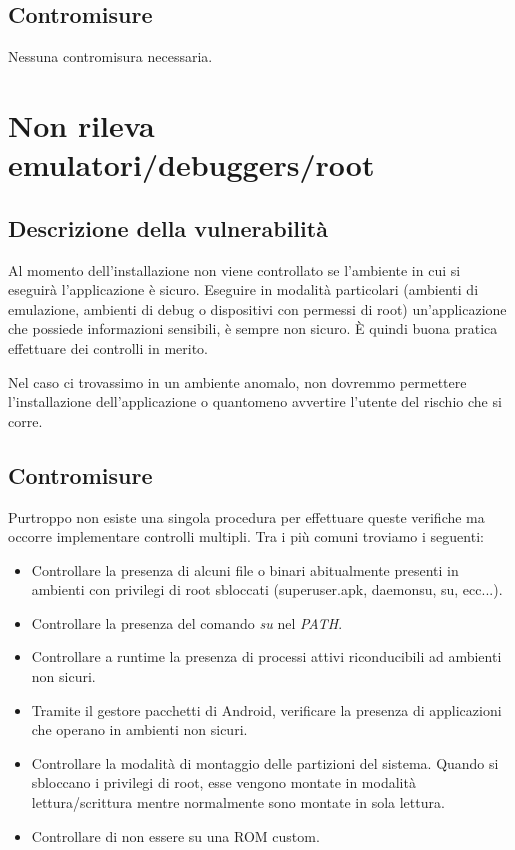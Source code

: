 \subsection{Contromisure}
Nessuna contromisura necessaria.

\section{Non rileva emulatori/debuggers/root}

\subsection{Descrizione della vulnerabilità}
Al momento dell'installazione non viene controllato se l'ambiente in cui si eseguirà l'applicazione è sicuro. Eseguire in modalità particolari (ambienti di emulazione, ambienti di debug o dispositivi con permessi di root) un'applicazione che possiede informazioni sensibili, è sempre non sicuro. È quindi buona pratica effettuare dei controlli in merito. 

Nel caso ci trovassimo in un ambiente anomalo, non dovremmo permettere l'installazione dell'applicazione o quantomeno avvertire l'utente del rischio che si corre. 

\subsection{Contromisure}
Purtroppo non esiste una singola procedura per effettuare queste verifiche ma occorre implementare controlli multipli. Tra i più comuni troviamo i seguenti:
\begin{itemize}
	\item Controllare la presenza di alcuni file o binari abitualmente presenti in ambienti con privilegi di root sbloccati (superuser.apk, daemonsu, su, ecc...).
	\item Controllare la presenza del comando \emph{su} nel \emph{PATH}.
	\item Controllare a runtime la presenza di processi attivi riconducibili ad ambienti non sicuri.
	\item Tramite il gestore pacchetti di Android, verificare la presenza di applicazioni che operano in ambienti non sicuri.
	\item Controllare la modalità di montaggio delle partizioni del sistema. Quando si sbloccano i privilegi di root, esse vengono montate in modalità lettura/scrittura mentre normalmente sono montate in sola lettura.
	\item Controllare di non essere su una ROM custom. 
\end{itemize} 
